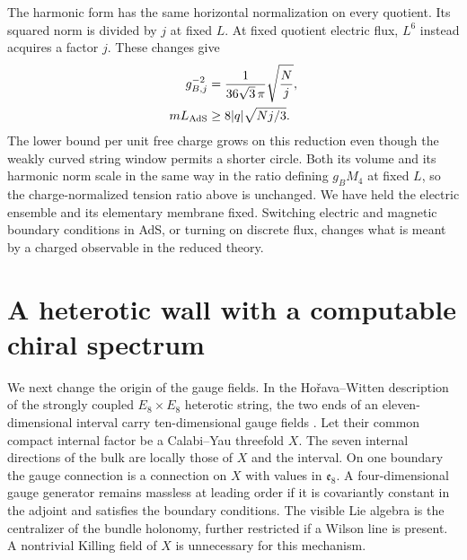 \documentclass[aps,prd,reprint,onecolumn,nofootinbib,amsmath,amssymb]{revtex4-2}
\begin{document}
The harmonic form has the same horizontal normalization on every quotient. Its squared norm is divided by $j$ at fixed $L$. At fixed quotient electric flux, $L^6$ instead acquires a factor $j$. These changes give
\begin{equation}
\begin{aligned}
 g_{B,j}^{-2}&=\frac{1}{36\sqrt3\,\pi}\sqrt{\frac Nj},\\
 m L_{\rm AdS}&\geq 8 |q|\sqrt{Nj/3}.
\end{aligned}
\end{equation}
The lower bound per unit free charge grows on this reduction even though the weakly curved string window permits a shorter circle. Both its volume and its harmonic norm scale in the same way in the ratio defining $g_B M_4$ at fixed $L$, so the charge-normalized tension ratio above is unchanged. We have held the electric ensemble and its elementary membrane fixed. Switching electric and magnetic boundary conditions in AdS, or turning on discrete flux, changes what is meant by a charged observable in the reduced theory.

\section{A heterotic wall with a computable chiral spectrum}
We next change the origin of the gauge fields. In the Ho\v{r}ava--Witten description of the strongly coupled $E_8\times E_8$ heterotic string, the two ends of an eleven-dimensional interval carry ten-dimensional gauge fields \cite{HW1996}. Let their common compact internal factor be a Calabi--Yau threefold $X$. The seven internal directions of the bulk are locally those of $X$ and the interval. On one boundary the gauge connection is a connection on $X$ with values in $\mathfrak e_8$. A four-dimensional gauge generator remains massless at leading order if it is covariantly constant in the adjoint and satisfies the boundary conditions. The visible Lie algebra is the centralizer of the bundle holonomy, further restricted if a Wilson line is present. A nontrivial Killing field of $X$ is unnecessary for this mechanism.
\end{document}
